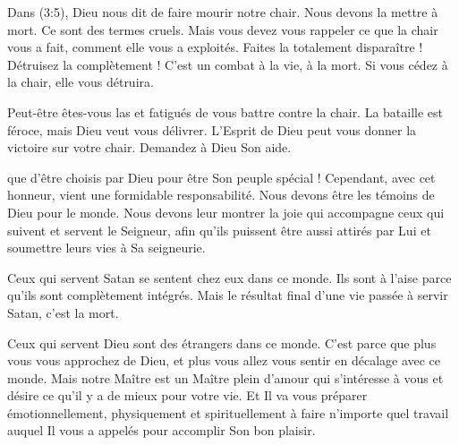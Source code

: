 
Dans (3:5), Dieu nous dit de faire mourir notre chair.
 Nous devons la mettre à mort. Ce sont des termes cruels.
 Mais vous devez vous rappeler ce que la chair vous a fait,
 comment elle vous a exploités. Faites la totalement disparaître !
 Détruisez la complètement ! C'est un combat à la vie, à la mort.
 Si vous cédez à la chair, elle vous détruira.

Peut-être êtes-vous las et fatigués de vous battre contre la chair.
 La bataille est féroce, mais Dieu veut vous délivrer.
 L'Esprit de Dieu peut vous donner la victoire sur votre chair.
 Demandez à Dieu Son aide. 

\dvrule






 que d'être choisis par Dieu
 pour être Son peuple spécial !
 Cependant, avec cet honneur, vient une formidable responsabilité.
 Nous devons être les témoins de Dieu pour le monde.
 Nous devons leur montrer la joie qui accompagne ceux qui suivent
 et servent le Seigneur, afin qu'ils puissent être aussi attirés par Lui
 et soumettre leurs vies à Sa seigneurie. 


Ceux qui servent Satan se sentent chez eux dans ce monde.
 Ils sont à l'aise parce qu'ils sont complètement intégrés.
 Mais le résultat final d'une vie passée à servir Satan, c'est la mort.

Ceux qui servent Dieu sont des étrangers dans ce monde.
 C'est parce que plus vous vous approchez de Dieu,
 et plus vous allez vous sentir en décalage avec ce monde.
 Mais notre Maître est un Maître plein d'amour qui s'intéresse à vous
 et désire ce qu'il y a de mieux pour votre vie.
 Et Il va vous préparer émotionnellement, physiquement et spirituellement
 à faire n'importe quel travail auquel Il vous a appelés
 pour accomplir Son bon plaisir.

